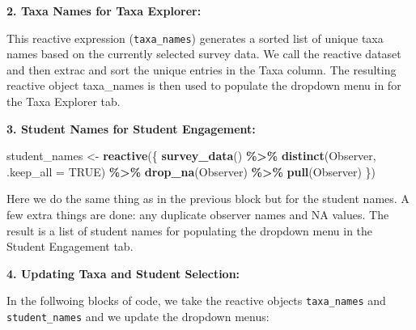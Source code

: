 \documentclass[
]{book}
\newenvironment{Shaded}{\begin{snugshade}}{\end{snugshade}}
\newcommand{\AttributeTok}[1]{\textcolor[rgb]{0.13,0.29,0.53}{#1}}
\newcommand{\ConstantTok}[1]{\textcolor[rgb]{0.56,0.35,0.01}{#1}}
\newcommand{\FunctionTok}[1]{\textcolor[rgb]{0.13,0.29,0.53}{\textbf{#1}}}
\newcommand{\NormalTok}[1]{#1}
\newcommand{\OtherTok}[1]{\textcolor[rgb]{0.56,0.35,0.01}{#1}}
\newcommand{\SpecialCharTok}[1]{\textcolor[rgb]{0.81,0.36,0.00}{\textbf{#1}}}
\begin{document}
\textbf{2. Taxa Names for Taxa Explorer:}

\begin{Shaded}
\end{Shaded}

This reactive expression (\texttt{taxa\_names}) generates a sorted list of unique taxa names based on the currently selected survey data. We call the reactive dataset and then extrac and sort the unique entries in the Taxa column. The resulting reactive object taxa\_names is then used to populate the dropdown menu in for the Taxa Explorer tab.

\textbf{3. Student Names for Student Engagement:}

\begin{Shaded}
\begin{Highlighting}[]
\NormalTok{student\_names }\OtherTok{\textless{}{-}} \FunctionTok{reactive}\NormalTok{(\{}
  \FunctionTok{survey\_data}\NormalTok{() }\SpecialCharTok{\%\textgreater{}\%}
    \FunctionTok{distinct}\NormalTok{(Observer, }\AttributeTok{.keep\_all =} \ConstantTok{TRUE}\NormalTok{) }\SpecialCharTok{\%\textgreater{}\%}
    \FunctionTok{drop\_na}\NormalTok{(Observer) }\SpecialCharTok{\%\textgreater{}\%}
    \FunctionTok{pull}\NormalTok{(Observer)}
\NormalTok{\})}
\end{Highlighting}
\end{Shaded}

Here we do the same thing as in the previous block but for the student names. A few extra things are done: any duplicate observer names and NA values. The result is a list of student names for populating the dropdown menu in the Student Engagement tab.

\textbf{4. Updating Taxa and Student Selection:}

In the follwoing blocks of code, we take the reactive objects \texttt{taxa\_names} and \texttt{student\_names} and we update the dropdown menus:
\end{document}
